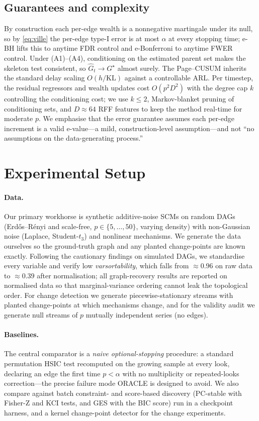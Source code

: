 \documentclass[preprint,12pt,authoryear]{elsarticle}
\begin{document}
\subsection{Guarantees and complexity}
\label{sec:guarantees}
By construction each per-edge wealth is a nonnegative martingale under its null,
so by \eqref{eq:ville} the per-edge type-I error is at most $\alpha$ at every
stopping time; e-BH lifts this to anytime FDR control and e-Bonferroni to
anytime FWER control. Under (A1)--(A4), conditioning on the estimated parent set
makes the skeleton test consistent, so $\hat G_t \to G^\star$ almost surely. The
Page--CUSUM inherits the standard delay scaling $O(h / \mathrm{KL})$ against a
controllable ARL. Per timestep, the residual regressors and wealth updates cost
$O(p^2 D^2)$ with the degree cap $k$ controlling the conditioning cost; we use
$k \le 2$, Markov-blanket pruning of conditioning sets, and $D \approx 64$ RFF
features to keep the method real-time for moderate $p$. We emphasise that the
error guarantee assumes each per-edge increment is a valid e-value---a
mild, construction-level assumption---and not ``no assumptions on the
data-generating process.''

\section{Experimental Setup}
\label{sec:setup}
\paragraph{Data.}
Our primary workhorse is synthetic additive-noise SCMs on random DAGs
(Erd\H{o}s--R\'enyi and scale-free, $p \in \{5,\dots,50\}$, varying density)
with non-Gaussian noise (Laplace, Student-$t_3$) and nonlinear mechanisms. We
generate the data ourselves so the ground-truth graph and any planted
change-points are known exactly. Following the cautionary findings on simulated
DAGs, we standardise every variable and verify low \emph{varsortability}, which
falls from $\approx 0.96$ on raw data to $\approx 0.39$ after normalisation; all
graph-recovery results are reported on normalised data so that marginal-variance
ordering cannot leak the topological order. For change detection we generate
piecewise-stationary streams with planted change-points at which mechanisms
change, and for the validity audit we generate null streams of $p$ mutually
independent series (no edges).

\paragraph{Baselines.}
The central comparator is a \emph{naive optional-stopping} procedure: a standard
permutation HSIC test recomputed on the growing sample at every look, declaring
an edge the first time $p<\alpha$ with no multiplicity or repeated-looks
correction---the precise failure mode ORACLE is designed to avoid. We also
compare against batch constraint- and score-based discovery (PC-stable with
Fisher-Z and KCI tests, and GES with the BIC score) run in a checkpoint harness,
and a kernel change-point detector for the change experiments.
\end{document}
